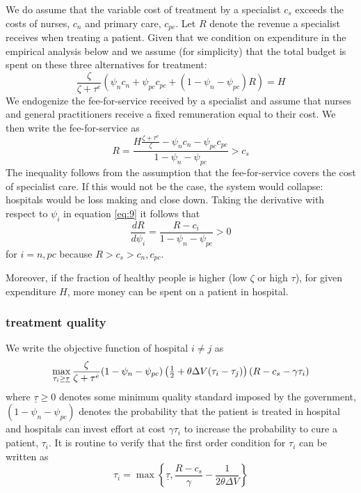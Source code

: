 \documentclass{article}
\begin{document}
We do assume that the variable cost of treatment by a specialist \(c_s\) exceeds the costs of nurses, \(c_n\) and primary care, \(c_{pc}\). Let \(R\) denote the revenue a specialist receives when treating a patient. Given that we condition on expenditure in the empirical analysis below and we assume (for simplicity) that the total budget is spent on these three alternatives for treatment:
\begin{equation}
\label{eq:9}
\frac{\zeta}{\zeta + \tau^e}(\psi_n c_n + \psi_{pc} c_{pc} + (1-\psi_n-\psi_{pc}) R) = H
\end{equation}
We endogenize the fee-for-service received by a specialist and assume that nurses and general practitioners receive a fixed remuneration equal to their cost. We then write the fee-for-service as
\begin{equation}
\label{eq:10}
R = \frac{H \frac{\zeta + \tau^{e}}{\zeta}-\psi_n c_n - \psi_{pc} c_{pc}}{1-\psi_n -\psi_{pc}} > c_s
\end{equation}
The inequality follows from the assumption that the fee-for-service covers the cost of specialist care. If this would not be the case, the system would collapse: hospitals would be loss making and close down. Taking the derivative with respect to \(\psi_i\) in equation \eqref{eq:9} it follows that
\begin{equation}
\label{eq:11}
\frac{dR}{d\psi_i} = \frac{R-c_i}{1-\psi_n - \psi_{pc}} > 0
\end{equation}
for \(i=n,pc\) because \(R>c_s>c_n,c_{pc}\).

Moreover, if the fraction of healthy people is higher (low \(\zeta\) or high \(\tau\)), for given expenditure \(H\), more money can be spent on a patient in hospital.

\subsubsection{treatment quality}
\label{sec:org3976ac8}

We write the objective function of hospital \(i \neq j\) as
\begin{equation}
\label{eq:12}
\max_{\tau_i \geq \underline \tau} \frac{\zeta}{\zeta + \tau^e}(1-\psi_n-\psi_{pc})\left( \textstyle{1\over 2}  + \theta \Delta V (\tau_i - \tau_j) \right)(R-c_s - \gamma \tau_i)
\end{equation}
where \(\underline \tau \geq 0\) denotes some minimum quality standard imposed by the government, \((1-\psi_n - \psi_{pc})\) denotes the probability that the patient is treated in hospital and hospitals can invest effort at cost \(\gamma \tau_i\) to increase the probability to cure a patient, \(\tau_i\). It is routine to verify that the first order condition for \(\tau_i\) can be written as
\begin{equation}
\label{eq:13}
\tau_i = \max \left\{ \underline \tau, \frac{R-c_s}{\gamma} - \frac{1}{2 \theta \Delta V} \right\}
\end{equation}
\end{document}
